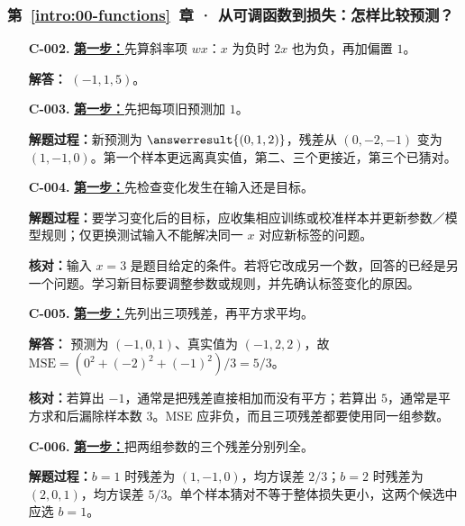 \subsubsection*{第~\ref*{intro:00-functions}~章 · 从可调函数到损失：怎样比较预测？}
\begin{enumerate}[label={},leftmargin=4.8em,itemsep=4pt]
\item[\textbf{C-002.}] \leavevmode{}\label{solution:C-002}\label{solution:linear-prediction}\hyperref[exercise:linear-prediction]{\textbf{第一步：}}先算斜率项 $wx$：$x$ 为负时 $2x$ 也为负，再加偏置 $1$。\par\nobreak
\textbf{解答：} $(-1,1,5)$。
\item[\textbf{C-003.}] \leavevmode{}\label{solution:C-003}\label{solution:bias-shift}\hyperref[exercise:bias-shift]{\textbf{第一步：}}先把每项旧预测加 $1$。\par\nobreak
\textbf{解题过程：}新预测为 $\answerresult{(0,1,2)}$，残差从 $(0,-2,-1)$ 变为 $(1,-1,0)$。第一个样本更远离真实值，第二、三个更接近，第三个已猜对。
\item[\textbf{C-004.}] \leavevmode{}\label{solution:C-004}\label{solution:target-change}\hyperref[exercise:target-change]{\textbf{第一步：}}先检查变化发生在输入还是目标。\par\nobreak\textbf{解题过程：}要学习变化后的目标，应收集相应训练或校准样本并更新参数／模型规则；仅更换测试输入不能解决同一 $x$ 对应新标签的问题。\par\textbf{核对：}输入 $x=3$ 是题目给定的条件。若将它改成另一个数，回答的已经是另一个问题。学习新目标要调整参数或规则，并先确认标签变化的原因。
\item[\textbf{C-005.}] \leavevmode{}\label{solution:C-005}\label{solution:three-point-mse}\hyperref[exercise:three-point-mse]{\textbf{第一步：}}先列出三项残差，再平方求平均。\par\nobreak
\textbf{解答：} 预测为 $(-1,0,1)$、真实值为 $(-1,2,2)$，故 $\mathrm{MSE}=(0^2+(-2)^2+(-1)^2)/3=5/3$。\par\textbf{核对：}若算出 $-1$，通常是把残差直接相加而没有平方；若算出 $5$，通常是平方求和后漏除样本数 $3$。MSE 应非负，而且三项残差都要使用同一组参数。
\item[\textbf{C-006.}] \leavevmode{}\label{solution:C-006}\label{solution:bias-candidate-comparison}\hyperref[exercise:bias-candidate-comparison]{\textbf{第一步：}}把两组参数的三个残差分别列全。\par\nobreak\textbf{解题过程：}$b=1$ 时残差为 $(1,-1,0)$，均方误差 $2/3$；$b=2$ 时残差为 $(2,0,1)$，均方误差 $5/3$。单个样本猜对不等于整体损失更小，这两个候选中应选 $b=1$。
\end{enumerate}
